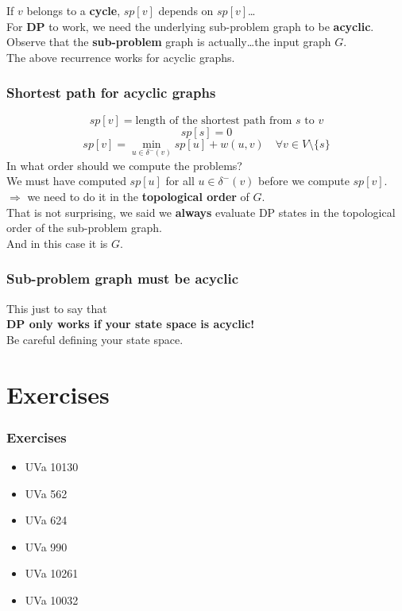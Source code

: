 \documentclass[12pt]{beamer}
\newcommand{\blank}{\vspace{.5cm}}
\begin{document}
\begin{frame}
\end{frame}

\begin{frame}
    If $v$ belongs to a \textbf{cycle}, $sp[v]$ depends on $sp[v]$\ldots \\\blank
    For \textbf{DP} to work, we need the underlying sub-problem graph to be \textbf{acyclic}. \\\blank
    Observe that the \textbf{sub-problem} graph is actually\ldots the input graph $G$. \\\blank
    The above recurrence works for acyclic graphs.

\end{frame}

\begin{frame}
    \frametitle{Shortest path for acyclic graphs}
    \[ sp[v] = \text{length of the shortest path from $s$ to $v$} \]
    \[ sp[s] = 0 \]
    \[ sp[v] = \min_{u \in \delta^-(v)} sp[u] + w(u, v) \quad \forall v \in V \setminus \{s\} \]
    \blank
    In what order should we compute the problems? \pause\\\blank
    We must have computed $sp[u]$ for all $u \in \delta^-(v)$ before we compute $sp[v]$. \\\blank
    $\Rightarrow$ we need to do it in the \textbf{topological order} of $G$. \pause \\\blank
    That is not surprising, we said we \textbf{always} evaluate DP states in the topological order of the sub-problem graph. \\
    And in this case it is $G$.
\end{frame}

\begin{frame}
    \frametitle{Sub-problem graph must be acyclic}
    This just to say that \\\blank
    \textbf{DP only works if your state space is acyclic!} \\\blank
    Be careful defining your state space.
\end{frame}

\section{Exercises}
\begin{frame}
    \frametitle{Exercises}
    \begin{itemize}
    	\item UVa 10130 
		\item UVa 562
		\item UVa 624
		\\\blank
		\item UVa 990
		\item UVa 10261
		\\\blank
		\item UVa 10032
    \end{itemize}
\end{frame}
\end{document}
